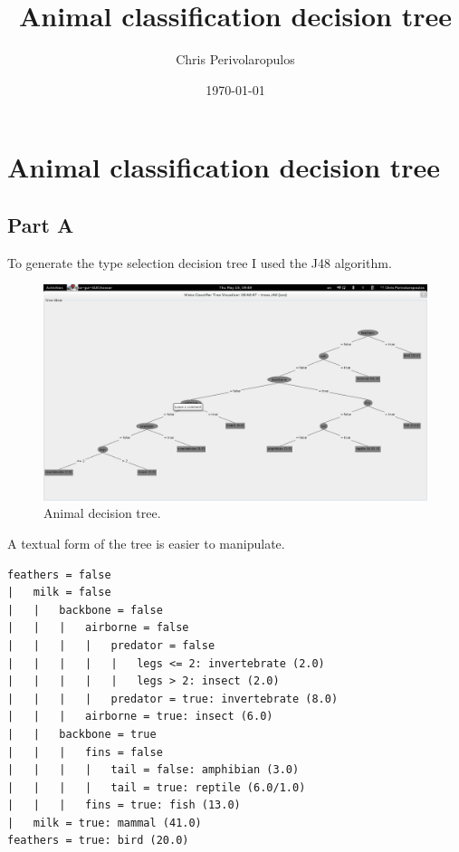 \documentclass[11pt,a4paper]{article}
\title{Animal classification decision tree}
\author{Chris Perivolaropulos}
\date{\today}
\begin{document}
\maketitle

\setcounter{tocdepth}{3}
\tableofcontents
\vspace*{1cm}

\section{Animal classification decision tree}
\label{sec-1}
\subsection{Part A}
\label{sec-1-1}

   To generate the type selection decision tree I used the J48 algorithm.

   \begin{figure}[htb]
   \centering
   \includegraphics[width=.9\linewidth]{./animaltree.png}
   \caption{Animal decision tree.}
   \end{figure}


   A textual form of the tree is easier to manipulate.


\begin{verbatim}
feathers = false
|   milk = false
|   |   backbone = false
|   |   |   airborne = false
|   |   |   |   predator = false
|   |   |   |   |   legs <= 2: invertebrate (2.0)
|   |   |   |   |   legs > 2: insect (2.0)
|   |   |   |   predator = true: invertebrate (8.0)
|   |   |   airborne = true: insect (6.0)
|   |   backbone = true
|   |   |   fins = false
|   |   |   |   tail = false: amphibian (3.0)
|   |   |   |   tail = true: reptile (6.0/1.0)
|   |   |   fins = true: fish (13.0)
|   milk = true: mammal (41.0)
feathers = true: bird (20.0)
\end{verbatim}
\end{document}
